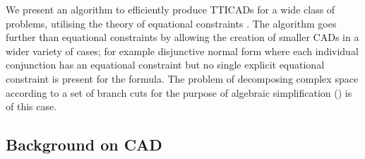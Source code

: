 \documentclass{article}
\begin{document}
We present an algorithm to efficiently produce TTICADs for a wide class of problems, utilising the theory of equational constraints \cite{McCallum1999a}.  The algorithm goes further than equational constraints by allowing the creation of smaller CADs in a wider variety of cases; for example disjunctive normal form where each individual conjunction has an equational constraint but no single explicit equational constraint is present for the formula.  The problem of decomposing complex space according to a set of branch cuts for the purpose of algebraic simplification (\cite[etc.]{Phisanbutetal2010a}) is of this case.  

\subsection{Background on CAD}
\end{document}
